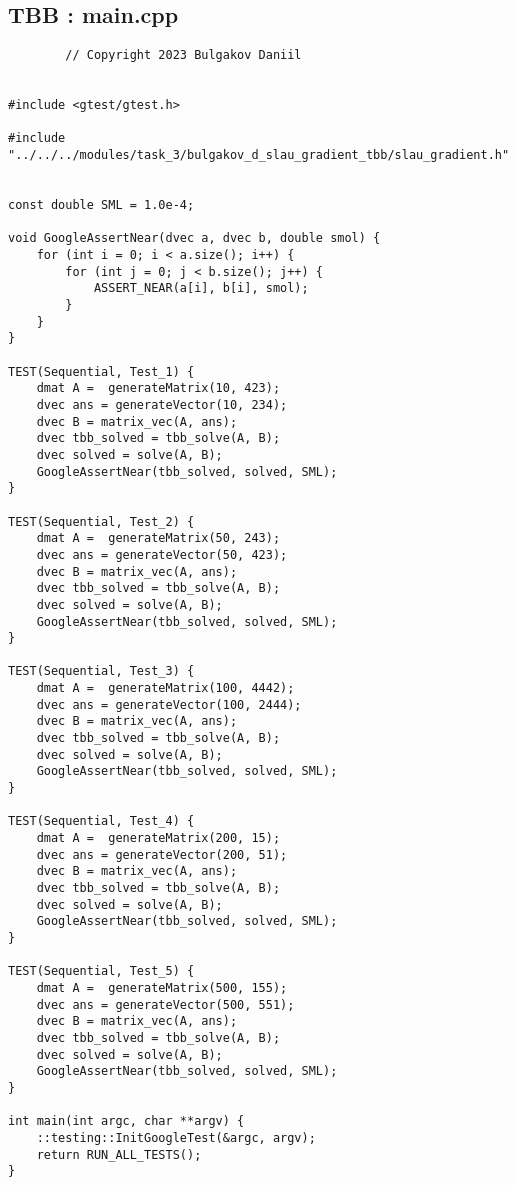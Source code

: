 \documentclass[14pt, russian]{extarticle}
\begin{document}
        \subsection{TBB : main.cpp}
        \begin{lstlisting}
        // Copyright 2023 Bulgakov Daniil


#include <gtest/gtest.h>

#include "../../../modules/task_3/bulgakov_d_slau_gradient_tbb/slau_gradient.h"


const double SML = 1.0e-4;

void GoogleAssertNear(dvec a, dvec b, double smol) {
    for (int i = 0; i < a.size(); i++) {
        for (int j = 0; j < b.size(); j++) {
            ASSERT_NEAR(a[i], b[i], smol);
        }
    }
}

TEST(Sequential, Test_1) {
    dmat A =  generateMatrix(10, 423);
    dvec ans = generateVector(10, 234);
    dvec B = matrix_vec(A, ans);
    dvec tbb_solved = tbb_solve(A, B);
    dvec solved = solve(A, B);
    GoogleAssertNear(tbb_solved, solved, SML);
}

TEST(Sequential, Test_2) {
    dmat A =  generateMatrix(50, 243);
    dvec ans = generateVector(50, 423);
    dvec B = matrix_vec(A, ans);
    dvec tbb_solved = tbb_solve(A, B);
    dvec solved = solve(A, B);
    GoogleAssertNear(tbb_solved, solved, SML);
}

TEST(Sequential, Test_3) {
    dmat A =  generateMatrix(100, 4442);
    dvec ans = generateVector(100, 2444);
    dvec B = matrix_vec(A, ans);
    dvec tbb_solved = tbb_solve(A, B);
    dvec solved = solve(A, B);
    GoogleAssertNear(tbb_solved, solved, SML);
}

TEST(Sequential, Test_4) {
    dmat A =  generateMatrix(200, 15);
    dvec ans = generateVector(200, 51);
    dvec B = matrix_vec(A, ans);
    dvec tbb_solved = tbb_solve(A, B);
    dvec solved = solve(A, B);
    GoogleAssertNear(tbb_solved, solved, SML);
}

TEST(Sequential, Test_5) {
    dmat A =  generateMatrix(500, 155);
    dvec ans = generateVector(500, 551);
    dvec B = matrix_vec(A, ans);
    dvec tbb_solved = tbb_solve(A, B);
    dvec solved = solve(A, B);
    GoogleAssertNear(tbb_solved, solved, SML);
}

int main(int argc, char **argv) {
    ::testing::InitGoogleTest(&argc, argv);
    return RUN_ALL_TESTS();
}
        \end{lstlisting}
\end{document}
